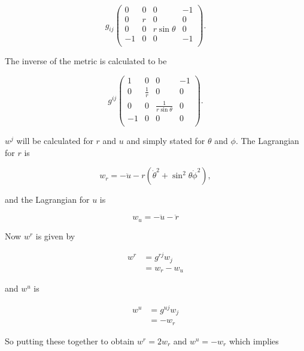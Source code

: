 \begin{equation*}
g_{ij}
\left(
\begin{array}{cccc}
0  & 0 & 0             & -1 \\
0  & r & 0             & 0  \\
0  & 0 & r\sin{\theta} & 0  \\
-1 & 0 & 0             & -1 \\
\end{array}
\right).
\end{equation*}

\noindent The inverse of the metric is calculated to be

\begin{equation*}
g^{ij}
\left(
\begin{array}{cccc}
1  & 0           & 0                       & -1 \\
0  & \frac{1}{r} & 0                       & 0  \\
0  & 0           & \frac{1}{r\sin{\theta}} & 0  \\
-1 & 0           & 0                       & 0  \\
\end{array}
\right).
\end{equation*}

\noindent $w^{j}$ will be calculated for $r$ and $u$ and simply stated for $\theta$ and $\phi$. The Lagrangian for $r$ is

\begin{equation*}
w_{r} = - \ddot{u} - r (\dot{\theta}^2 + \sin^2{\theta}\dot{\phi}^2),
\end{equation*}

\noindent and the Lagrangian for $u$ is

\begin{equation*}
w_{u} = - \ddot{u} - \ddot{r}  
\end{equation*}
 
\noindent Now $w^{r}$ is given by

\begin{align*}
w^{r} & = g^{rj} w_{j} \\
      & = w_{r} - w_{u}
\end{align*}

and $w^{u}$ is

\begin{align*}
w^{u} & = g^{uj} w_{j} \\
      & =  - w_{r}
\end{align*}

\noindent So putting these together to obtain $w^{r} = 2w_{r}$ and $w^{u} = -w_{r}$ which implies

